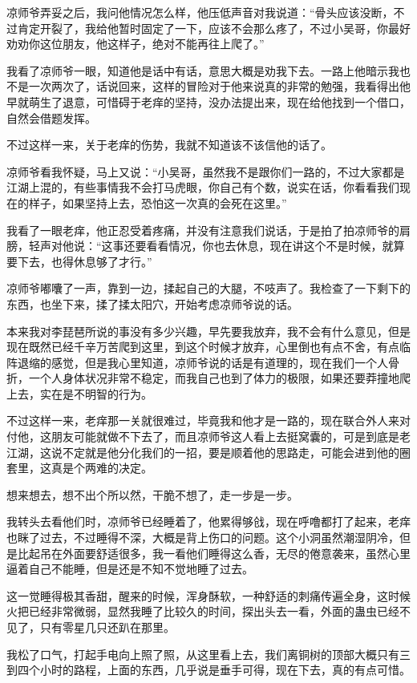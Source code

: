 凉师爷弄妥之后，我问他情况怎么样，他压低声音对我说道：“骨头应该没断，不过肯定开裂了，我给他暂时固定了一下，应该不会那么疼了，不过小吴哥，你最好劝劝你这位朋友，他这样子，绝对不能再往上爬了。”

我看了凉师爷一眼，知道他是话中有话，意思大概是劝我下去。一路上他暗示我也不是一次两次了，话说回来，这样的冒险对于他来说真的非常的勉强，我看得出他早就萌生了退意，可惜碍于老痒的坚持，没办法提出来，现在给他找到一个借口，自然会借题发挥。

不过这样一来，关于老痒的伤势，我就不知道该不该信他的话了。

凉师爷看我怀疑，马上又说：“小吴哥，虽然我不是跟你们一路的，不过大家都是江湖上混的，有些事情我不会打马虎眼，你自己有个数，说实在话，你看看我们现在的样子，如果坚持上去，恐怕这一次真的会死在这里。”

我看了一眼老痒，他正忍受着疼痛，并没有注意我们说话，于是拍了拍凉师爷的肩膀，轻声对他说：“这事还要看看情况，你也去休息，现在讲这个不是时候，就算要下去，也得休息够了才行。”

凉师爷嘟囔了一声，靠到一边，揉起自己的大腿，不吱声了。我检查了一下剩下的东西，也坐下来，揉了揉太阳穴，开始考虑凉师爷说的话。

本来我对李琵琶所说的事没有多少兴趣，早先要我放弃，我不会有什么意见，但是现在既然已经千辛万苦爬到这里，到这个时候才放弃，心里倒也有点不舍，有点临阵退缩的感觉，但是我心里知道，凉师爷说的话是有道理的，现在我们一个人骨折，一个人身体状况非常不稳定，而我自己也到了体力的极限，如果还要莽撞地爬上去，实在是不明智的行为。

不过这样一来，老痒那一关就很难过，毕竟我和他才是一路的，现在联合外人来对付他，这朋友可能就做不下去了，而且凉师爷这人看上去挺窝囊的，可是到底是老江湖，这说不定就是他分化我们的一招，要是顺着他的思路走，可能会进到他的圈套里，这真是个两难的决定。

想来想去，想不出个所以然，干脆不想了，走一步是一步。

我转头去看他们时，凉师爷已经睡着了，他累得够戗，现在呼噜都打了起来，老痒也眯了过去，不过睡得不深，大概是背上伤口的问题。这个小洞虽然潮湿阴冷，但是比起吊在外面要舒适很多，我一看他们睡得这么香，无尽的倦意袭来，虽然心里逼着自己不能睡，但是还是不知不觉地睡了过去。

这一觉睡得极其香甜，醒来的时候，浑身酥软，一种舒适的刺痛传遍全身，这时候火把已经非常微弱，显然我睡了比较久的时间，探出头去一看，外面的蛊虫已经不见了，只有零星几只还趴在那里。

我松了口气，打起手电向上照了照，从这里看上去，我们离铜树的顶部大概只有三到四个小时的路程，上面的东西，几乎说是垂手可得，现在下去，真的有点可惜。

